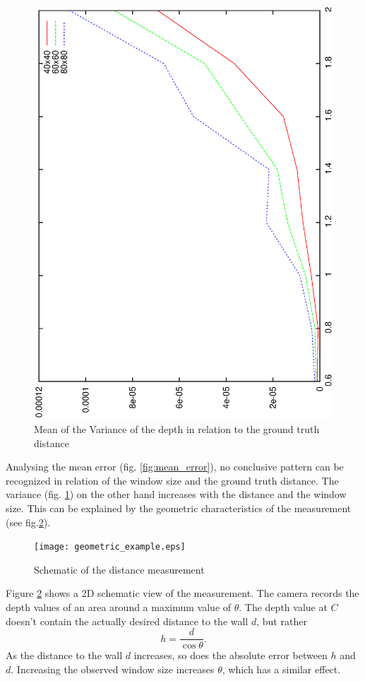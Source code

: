 \documentclass[DIV12,a4paper]{scrartcl}
\begin{document}
\begin{figure}[!htbp]
  \centering
  \includegraphics[height=0.8\textwidth,angle=270]{figures/variances.eps}
  \caption{Mean of the Variance of the depth in relation to the ground truth distance}
  \label{fig:variance}
\end{figure}
Analysing the mean error (fig. \ref{fig:mean_error}), no conclusive pattern can be recognized in relation of the window size and the ground truth distance. The variance (fig. \ref{fig:variance}) on the other hand increases with the distance and the window size. This can be explained by the geometric characteristics of the measurement (see fig.\ref{fig:geometric_representation}).
\begin{figure}[!ht]
  \centering
  \texttt{[image: geometric\_example.eps]}
  \caption{Schematic of the distance measurement}
  \label{fig:geometric_representation}
\end{figure}\par
Figure \ref{fig:geometric_representation} shows a 2D schematic view of the measurement. The camera records the depth values of an area around a maximum value of $\theta$. The depth value at $C$ doesn't contain the actually desired distance to the wall $d$, but rather\[ h=\frac{d}{\cos\theta}.\]
As the distance to the wall $d$ increases, so does the absolute error between $h$ and $d$. Increasing the observed window size increases $\theta$, which has a similar effect.

\newpage
\end{document}
